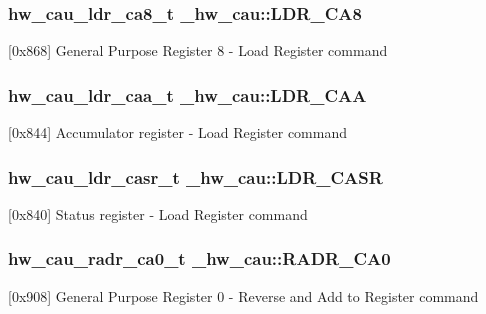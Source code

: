\subsubsection[{\texorpdfstring{L\+D\+R\+\_\+\+C\+A8}{LDR_CA8}}]{ {\bf hw\+\_\+cau\+\_\+ldr\+\_\+ca8\+\_\+t} \+\_\+hw\+\_\+cau\+::\+L\+D\+R\+\_\+\+C\+A8}\hypertarget{struct__hw__cau_aa491f6e851a611edb7d3628fdb96a4d5}{}\label{struct__hw__cau_aa491f6e851a611edb7d3628fdb96a4d5}
\mbox{[}0x868\mbox{]} General Purpose Register 8 -\/ Load Register command 
\subsubsection[{\texorpdfstring{L\+D\+R\+\_\+\+C\+AA}{LDR_CAA}}]{ {\bf hw\+\_\+cau\+\_\+ldr\+\_\+caa\+\_\+t} \+\_\+hw\+\_\+cau\+::\+L\+D\+R\+\_\+\+C\+AA}\hypertarget{struct__hw__cau_a59db872e24514d04ffa5e9b7fa66ce0e}{}\label{struct__hw__cau_a59db872e24514d04ffa5e9b7fa66ce0e}
\mbox{[}0x844\mbox{]} Accumulator register -\/ Load Register command 
\subsubsection[{\texorpdfstring{L\+D\+R\+\_\+\+C\+A\+SR}{LDR_CASR}}]{ {\bf hw\+\_\+cau\+\_\+ldr\+\_\+casr\+\_\+t} \+\_\+hw\+\_\+cau\+::\+L\+D\+R\+\_\+\+C\+A\+SR}\hypertarget{struct__hw__cau_ac893719b742976d5e5dd048eb299b309}{}\label{struct__hw__cau_ac893719b742976d5e5dd048eb299b309}
\mbox{[}0x840\mbox{]} Status register -\/ Load Register command 
\subsubsection[{\texorpdfstring{R\+A\+D\+R\+\_\+\+C\+A0}{RADR_CA0}}]{ {\bf hw\+\_\+cau\+\_\+radr\+\_\+ca0\+\_\+t} \+\_\+hw\+\_\+cau\+::\+R\+A\+D\+R\+\_\+\+C\+A0}\hypertarget{struct__hw__cau_ad3ba91f54a6b2a3c3ff3befaf4e81120}{}\label{struct__hw__cau_ad3ba91f54a6b2a3c3ff3befaf4e81120}
\mbox{[}0x908\mbox{]} General Purpose Register 0 -\/ Reverse and Add to Register command 
